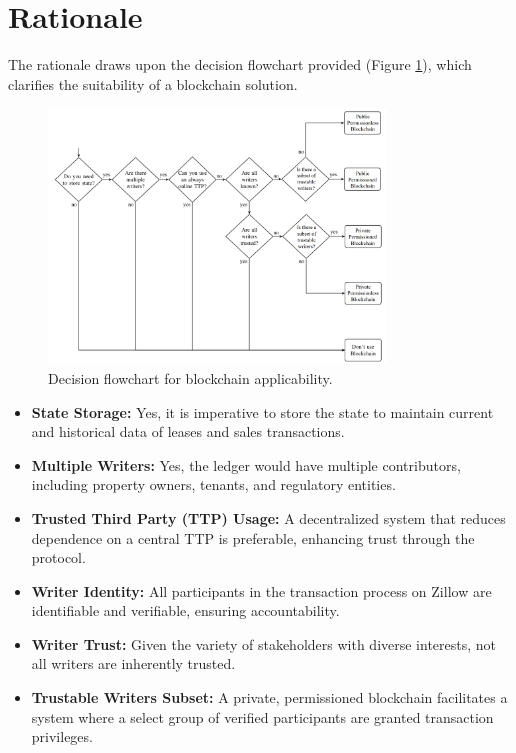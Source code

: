 \documentclass{article}
\begin{document}
\section*{Rationale}

The rationale draws upon the decision flowchart provided (Figure \ref{fig:blockchain_decision}), which clarifies the suitability of a blockchain solution.

\begin{figure}[H]
    \centering
    \includegraphics[width=0.8\textwidth]{decisiondiagram.png}
    \caption{Decision flowchart for blockchain applicability.}
    \label{fig:blockchain_decision}
\end{figure}

\begin{itemize}
    \item \textbf{State Storage:} Yes, it is imperative to store the state to maintain current and historical data of leases and sales transactions.
    
    \item \textbf{Multiple Writers:} Yes, the ledger would have multiple contributors, including property owners, tenants, and regulatory entities.
    
    \item \textbf{Trusted Third Party (TTP) Usage:} A decentralized system that reduces dependence on a central TTP is preferable, enhancing trust through the protocol.
    
    \item \textbf{Writer Identity:} All participants in the transaction process on Zillow are identifiable and verifiable, ensuring accountability.
    
    \item \textbf{Writer Trust:} Given the variety of stakeholders with diverse interests, not all writers are inherently trusted.
    
    \item \textbf{Trustable Writers Subset:} A private, permissioned blockchain facilitates a system where a select group of verified participants are granted transaction privileges.
\end{itemize}
\end{document}
